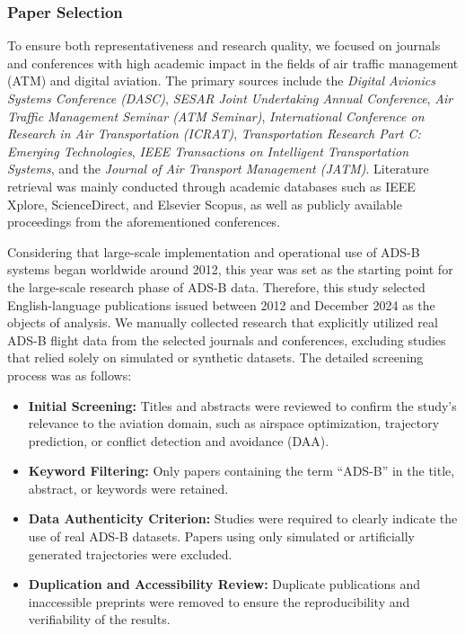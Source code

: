 \subsubsection{Paper Selection}

To ensure both representativeness and research quality, we focused on journals and conferences with high academic impact in the fields of air traffic management (ATM) and digital aviation. The primary sources include the \textit{Digital Avionics Systems Conference (DASC)}, \textit{SESAR Joint Undertaking Annual Conference}, \textit{Air Traffic Management Seminar (ATM Seminar)}, \textit{International Conference on Research in Air Transportation (ICRAT)}, \textit{Transportation Research Part C: Emerging Technologies}, \textit{IEEE Transactions on Intelligent Transportation Systems}, and the \textit{Journal of Air Transport Management (JATM)}. Literature retrieval was mainly conducted through academic databases such as IEEE Xplore, ScienceDirect, and Elsevier Scopus, as well as publicly available proceedings from the aforementioned conferences.

Considering that large-scale implementation and operational use of ADS-B systems began worldwide around 2012, this year was set as the starting point for the large-scale research phase of ADS-B data. Therefore, this study selected English-language publications issued between 2012 and December 2024 as the objects of analysis. We manually collected research that explicitly utilized real ADS-B flight data from the selected journals and conferences, excluding studies that relied solely on simulated or synthetic datasets.
The detailed screening process was as follows:

\begin{itemize}
	\item \textbf{Initial Screening:} Titles and abstracts were reviewed to confirm the study’s relevance to the aviation domain, such as airspace optimization, trajectory prediction, or conflict detection and avoidance (DAA).
	\item \textbf{Keyword Filtering:} Only papers containing the term ``ADS-B'' in the title, abstract, or keywords were retained.
	\item \textbf{Data Authenticity Criterion:} Studies were required to clearly indicate the use of real ADS-B datasets. Papers using only simulated or artificially generated trajectories were excluded.
	\item \textbf{Duplication and Accessibility Review:} Duplicate publications and inaccessible preprints were removed to ensure the reproducibility and verifiability of the results.
\end{itemize}

